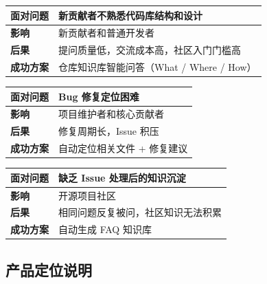 \documentclass[10pt,a4paper]{article}
\newenvironment{ieeetable}{\begin{center}}{\end{center}}
\begin{document}
\begin{ieeetable}
    \begin{tabularx}{\textwidth}{L{3.5cm} X}
        \toprule
        \textbf{面对问题} & 新贡献者不熟悉代码库结构和设计 \\
        \midrule
        \textbf{影响} & 新贡献者和普通开发者 \\
        \midrule
        \textbf{后果} & 提问质量低，交流成本高，社区入门门槛高 \\
        \midrule
        \textbf{成功方案} & 仓库知识库智能问答（What / Where / How） \\
        \bottomrule
    \end{tabularx}
\end{ieeetable}

\vspace{4pt}

\begin{ieeetable}
    \begin{tabularx}{\textwidth}{L{3.5cm} X}
        \toprule
        \textbf{面对问题} & Bug 修复定位困难 \\
        \midrule
        \textbf{影响} & 项目维护者和核心贡献者 \\
        \midrule
        \textbf{后果} & 修复周期长，Issue 积压 \\
        \midrule
        \textbf{成功方案} & 自动定位相关文件 + 修复建议 \\
        \bottomrule
    \end{tabularx}
\end{ieeetable}

\vspace{4pt}

\begin{ieeetable}
    \begin{tabularx}{\textwidth}{L{3.5cm} X}
        \toprule
        \textbf{面对问题} & 缺乏 Issue 处理后的知识沉淀 \\
        \midrule
        \textbf{影响} & 开源项目社区 \\
        \midrule
        \textbf{后果} & 相同问题反复被问，社区知识无法积累 \\
        \midrule
        \textbf{成功方案} & 自动生成 FAQ 知识库 \\
        \bottomrule
    \end{tabularx}
\end{ieeetable}

\subsection{产品定位说明}
\end{document}

